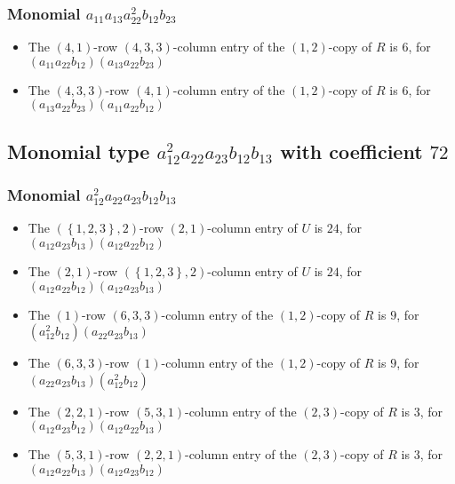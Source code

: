 \documentclass{article}
\begin{document}
\subsubsection{Monomial $ a_{11} a_{13} a_{22}^{2} b_{12} b_{23} $}

\begin{itemize}
\item The $(4, 1)$-row $(4, 3, 3)$-column entry of the $ \left(1, 2\right) $-copy of $R$ is $ 6 $, for $( a_{11} a_{22} b_{12} )( a_{13} a_{22} b_{23} )$ 
\item The $(4, 3, 3)$-row $(4, 1)$-column entry of the $ \left(1, 2\right) $-copy of $R$ is $ 6 $, for $( a_{13} a_{22} b_{23} )( a_{11} a_{22} b_{12} )$ 
\end{itemize}
\subsection{Monomial type $ a_{12}^{2} a_{22} a_{23} b_{12} b_{13} $ with coefficient $ 72 $}

\subsubsection{Monomial $ a_{12}^{2} a_{22} a_{23} b_{12} b_{13} $}

\begin{itemize}
\item The $ \left(\left\{1, 2, 3\right\}, 2\right) $-row $ \left(2, 1\right) $-column entry of $U$ is $ 24 $, for $( a_{12} a_{23} b_{13} )( a_{12} a_{22} b_{12} )$ 
\item The $ \left(2, 1\right) $-row $ \left(\left\{1, 2, 3\right\}, 2\right) $-column entry of $U$ is $ 24 $, for $( a_{12} a_{22} b_{12} )( a_{12} a_{23} b_{13} )$ 
\item The $(1)$-row $(6, 3, 3)$-column entry of the $ \left(1, 2\right) $-copy of $R$ is $ 9 $, for $( a_{12}^{2} b_{12} )( a_{22} a_{23} b_{13} )$ 
\item The $(6, 3, 3)$-row $(1)$-column entry of the $ \left(1, 2\right) $-copy of $R$ is $ 9 $, for $( a_{22} a_{23} b_{13} )( a_{12}^{2} b_{12} )$ 
\item The $(2, 2, 1)$-row $(5, 3, 1)$-column entry of the $ \left(2, 3\right) $-copy of $R$ is $ 3 $, for $( a_{12} a_{23} b_{12} )( a_{12} a_{22} b_{13} )$ 
\item The $(5, 3, 1)$-row $(2, 2, 1)$-column entry of the $ \left(2, 3\right) $-copy of $R$ is $ 3 $, for $( a_{12} a_{22} b_{13} )( a_{12} a_{23} b_{12} )$ 
\end{itemize}
\end{document}
